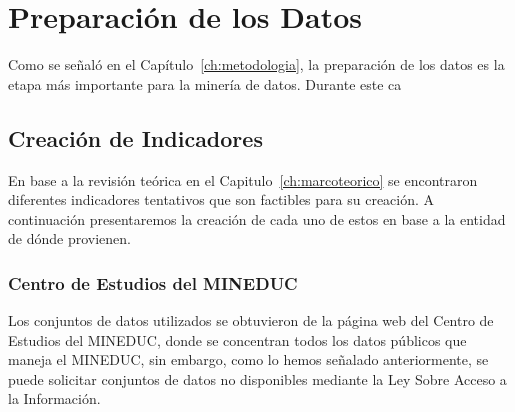 \section{Preparación de los Datos}
Como se señaló en el Capítulo~\ref{ch:metodologia}, la preparación de los datos es la etapa más importante para la minería de datos. Durante este ca
\subsection{Creación de Indicadores}
En base a la revisión teórica en el Capitulo~\ref{ch:marcoteorico} se encontraron diferentes indicadores tentativos que son factibles para su creación.
A continuación presentaremos la creación de cada uno de estos en base a la entidad de dónde provienen.
\subsubsection{Centro de Estudios del MINEDUC}
    Los conjuntos de datos utilizados se obtuvieron de la página web del Centro de Estudios del MINEDUC, donde se concentran todos los datos públicos que maneja el MINEDUC, sin embargo, como lo hemos señalado anteriormente, se puede solicitar conjuntos de datos no disponibles mediante la Ley Sobre Acceso a la Información.
    
